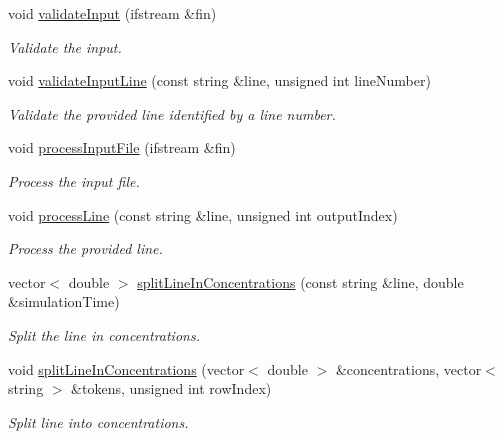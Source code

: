 \begin{DoxyCompactItemize}
void \hyperlink{classmultiscale_1_1video_1_1RectangularCsvToInputFilesConverter_ad8be93ca4e4efbc6394de6f9d688df51}{validate\-Input} (ifstream \&fin)
\begin{DoxyCompactList}\small\item\em \-Validate the input. \end{DoxyCompactList}\item 
void \hyperlink{classmultiscale_1_1video_1_1RectangularCsvToInputFilesConverter_a876c93163765bcae5d0b12047df99d58}{validate\-Input\-Line} (const string \&line, unsigned int line\-Number)
\begin{DoxyCompactList}\small\item\em \-Validate the provided line identified by a line number. \end{DoxyCompactList}\item 
void \hyperlink{classmultiscale_1_1video_1_1RectangularCsvToInputFilesConverter_acf389f7384f0646e922df99c27768a6f}{process\-Input\-File} (ifstream \&fin)
\begin{DoxyCompactList}\small\item\em \-Process the input file. \end{DoxyCompactList}\item 
void \hyperlink{classmultiscale_1_1video_1_1RectangularCsvToInputFilesConverter_a56fb3e2a0f7a24a73c24e3be8888774d}{process\-Line} (const string \&line, unsigned int output\-Index)
\begin{DoxyCompactList}\small\item\em \-Process the provided line. \end{DoxyCompactList}\item 
vector$<$ double $>$ \hyperlink{classmultiscale_1_1video_1_1RectangularCsvToInputFilesConverter_ab297918325583ff85c8740fa9c5661f6}{split\-Line\-In\-Concentrations} (const string \&line, double \&simulation\-Time)
\begin{DoxyCompactList}\small\item\em \-Split the line in concentrations. \end{DoxyCompactList}\item 
void \hyperlink{classmultiscale_1_1video_1_1RectangularCsvToInputFilesConverter_a6cfe59bda4fbe1944199b6d27f8ee8b0}{split\-Line\-In\-Concentrations} (vector$<$ double $>$ \&concentrations, vector$<$ string $>$ \&tokens, unsigned int row\-Index)
\begin{DoxyCompactList}\small\item\em \-Split line into concentrations. \end{DoxyCompactList}\item 

\end{DoxyCompactItemize}
